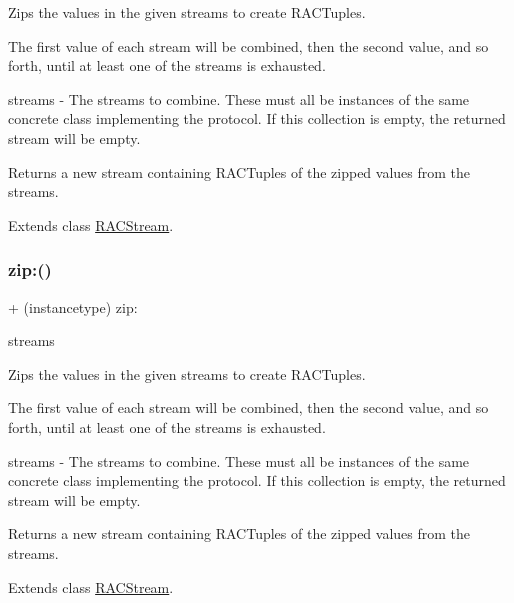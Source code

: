 Zips the values in the given streams to create R\+A\+C\+Tuples.

The first value of each stream will be combined, then the second value, and so forth, until at least one of the streams is exhausted.

streams -\/ The streams to combine. These must all be instances of the same concrete class implementing the protocol. If this collection is empty, the returned stream will be empty.

Returns a new stream containing R\+A\+C\+Tuples of the zipped values from the streams. 

Extends class \mbox{\hyperlink{interface_r_a_c_stream_a90ef5f217dc285dc831cc0d45166a529}{R\+A\+C\+Stream}}.

\mbox{\label{category_r_a_c_stream_07_operations_08_a90ef5f217dc285dc831cc0d45166a529}} 
\subsubsection{\texorpdfstring{zip\+:()}{zip:()}\hspace{0.1cm}{\footnotesize\ttfamily [3/3]}}
{\footnotesize\ttfamily + (instancetype) zip\+: \begin{DoxyParamCaption}\item[{(id$<$ N\+S\+Fast\+Enumeration $>$)}]{streams }\end{DoxyParamCaption}}

Zips the values in the given streams to create R\+A\+C\+Tuples.

The first value of each stream will be combined, then the second value, and so forth, until at least one of the streams is exhausted.

streams -\/ The streams to combine. These must all be instances of the same concrete class implementing the protocol. If this collection is empty, the returned stream will be empty.

Returns a new stream containing R\+A\+C\+Tuples of the zipped values from the streams. 

Extends class \mbox{\hyperlink{interface_r_a_c_stream_a90ef5f217dc285dc831cc0d45166a529}{R\+A\+C\+Stream}}.

\mbox{\label{category_r_a_c_stream_07_operations_08_aba7b1d8c9ac130afad52b0baca8ae016}} 
